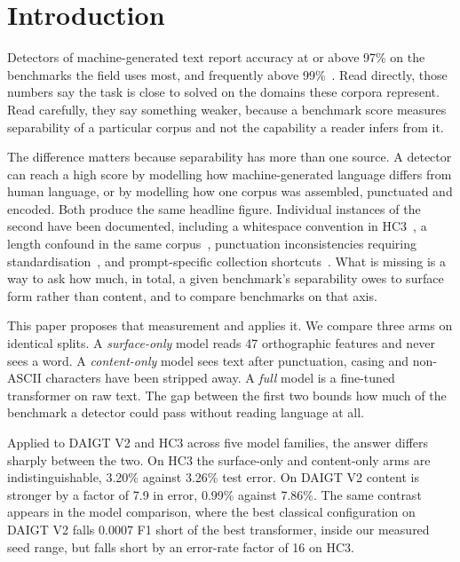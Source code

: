 \section{Introduction}

Detectors of machine-generated text report accuracy at or above 97\% on the benchmarks the field uses most, and frequently above 99\%~\cite{Guo2023close,Su2023plus,Zhou2024exploiting,Ansary2026multirepresentation}. Read directly, those numbers say the task is close to solved on the domains these corpora represent. Read carefully, they say something weaker, because a benchmark score measures separability of a particular corpus and not the capability a reader infers from it.

The difference matters because separability has more than one source. A detector can reach a high score by modelling how machine-generated language differs from human language, or by modelling how one corpus was assembled, punctuated and encoded. Both produce the same headline figure. Individual instances of the second have been documented, including a whitespace convention in HC3~\cite{Tian2023multiscale}, a length confound in the same corpus~\cite{Baidya2026detecting}, punctuation inconsistencies requiring standardisation~\cite{Ardeshirifar2025comparing}, and prompt-specific collection shortcuts~\cite{Park2024investigating}. What is missing is a way to ask how much, in total, a given benchmark's separability owes to surface form rather than content, and to compare benchmarks on that axis.

This paper proposes that measurement and applies it. We compare three arms on identical splits. A \emph{surface-only} model reads 47 orthographic features and never sees a word. A \emph{content-only} model sees text after punctuation, casing and non-ASCII characters have been stripped away. A \emph{full} model is a fine-tuned transformer on raw text. The gap between the first two bounds how much of the benchmark a detector could pass without reading language at all.

Applied to DAIGT V2 and HC3 across five model families, the answer differs sharply between the two. On HC3 the surface-only and content-only arms are indistinguishable, 3.20\% against 3.26\% test error. On DAIGT V2 content is stronger by a factor of 7.9 in error, 0.99\% against 7.86\%. The same contrast appears in the model comparison, where the best classical configuration on DAIGT V2 falls 0.0007 F1 short of the best transformer, inside our measured seed range, but falls short by an error-rate factor of 16 on HC3.

